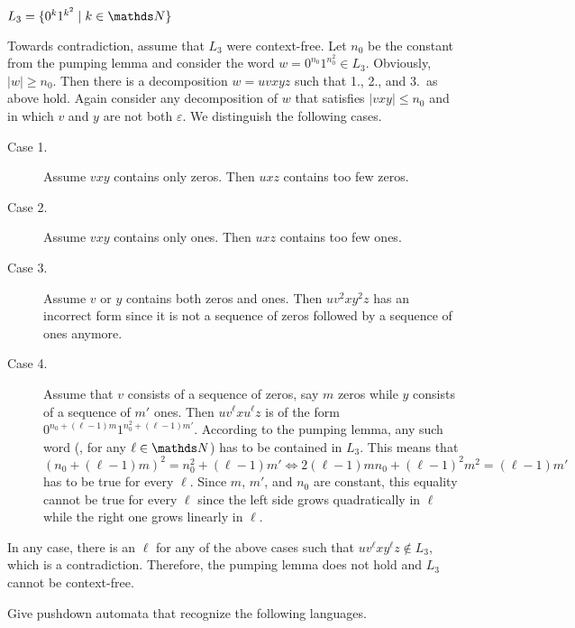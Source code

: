 \documentclass{exercise}
\begin{document}
\subtask $L_3=\{0^k1^{k^2} \mid k\in\nat\}$
  \begin{solution}
    Towards contradiction, assume that $L_3$ were context-free.
    Let $n_0$ be the constant from the pumping lemma and consider the word
    $w=0^{n_0}1^{n_0^2}\in L_3$.  Obviously, $|w| \ge n_0$.  Then there is a
    decomposition $w = uvxyz$ such that 1., 2., and 3.\ as above hold.
    Again consider any decomposition of $w$ that satisfies $|vxy| \le n_0$
    and in which $v$ and $y$ are not both $\varepsilon$.  We distinguish the
    following cases.
    \begin{description}
      \item[Case 1.] Assume $vxy$ contains only zeros.  Then $uxz$ contains
        too few zeros.
      \item[Case 2.] Assume $vxy$ contains only ones.  Then $uxz$ contains
        too few ones.
      \item[Case 3.] Assume $v$ or $y$ contains both zeros and ones.  Then
        $uv^2xy^2z$ has an incorrect form since it is not a sequence of zeros
        followed by a sequence of ones anymore.
      \item[Case 4.] Assume that $v$ consists of a sequence of zeros, say $m$
        zeros while $y$ consists of a sequence of $m'$ ones.  Then
        $uv^{\ell}xu^{\ell}z$ is of the form $0^{n_0+(\ell-1)m}1^{n_0^2+(\ell-1)m'}$.  According
        to the pumping lemma, any such word (\ie, for any $\ell\in\nat$) has to
        be contained in $L_3$.  This means that
        \[ (n_0+(\ell-1)m)^2=n_0^2+(\ell-1)m' \iff 2(\ell-1)mn_0+(\ell-1)^2m^2=(\ell-1)m' \]
        has to be true for every $\ell$.  Since $m$, $m'$, and $n_0$ are constant,
        this equality cannot be true for every $\ell$ since the left side grows
        quadratically in $\ell$ while the right one grows linearly in $\ell$.
    \end{description}
    In any case, there is an $\ell$ for any of the above cases such that
    $uv^{\ell}xy^{\ell}z\notin L_3$, which is a contradiction.  Therefore,
    the pumping lemma does not hold and $L_3$ cannot be context-free.
  \end{solution}


Give pushdown automata that recognize the following languages.
\end{document}
